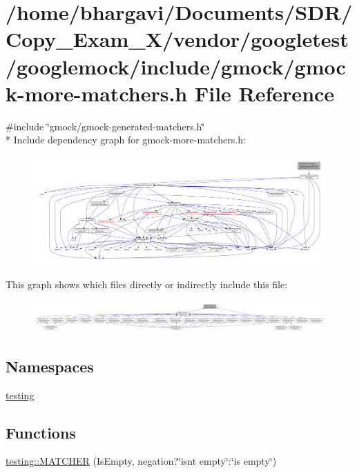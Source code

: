 \hypertarget{gmock-more-matchers_8h}{}\section{/home/bhargavi/\+Documents/\+S\+D\+R/\+Copy\+\_\+\+Exam\+\_\+X/vendor/googletest/googlemock/include/gmock/gmock-\/more-\/matchers.h File Reference}
\label{gmock-more-matchers_8h}
{\ttfamily \#include \char`\"{}gmock/gmock-\/generated-\/matchers.\+h\char`\"{}}\\*
Include dependency graph for gmock-\/more-\/matchers.h\+:
\nopagebreak
\begin{figure}[H]
\begin{center}
\leavevmode
\includegraphics[width=350pt]{gmock-more-matchers_8h__incl}
\end{center}
\end{figure}
This graph shows which files directly or indirectly include this file\+:
\nopagebreak
\begin{figure}[H]
\begin{center}
\leavevmode
\includegraphics[width=350pt]{gmock-more-matchers_8h__dep__incl}
\end{center}
\end{figure}
\subsection*{Namespaces}
\begin{DoxyCompactItemize}
\item 
 \hyperlink{namespacetesting}{testing}
\end{DoxyCompactItemize}
\subsection*{Functions}
\begin{DoxyCompactItemize}
\item 
\hyperlink{namespacetesting_a25b4065291778029b6311f07c2fc9cc3}{testing\+::\+M\+A\+T\+C\+H\+ER} (Is\+Empty, negation?\char`\"{}isn\textquotesingle{}t empty\char`\"{}\+:\char`\"{}is empty\char`\"{})
\end{DoxyCompactItemize}
